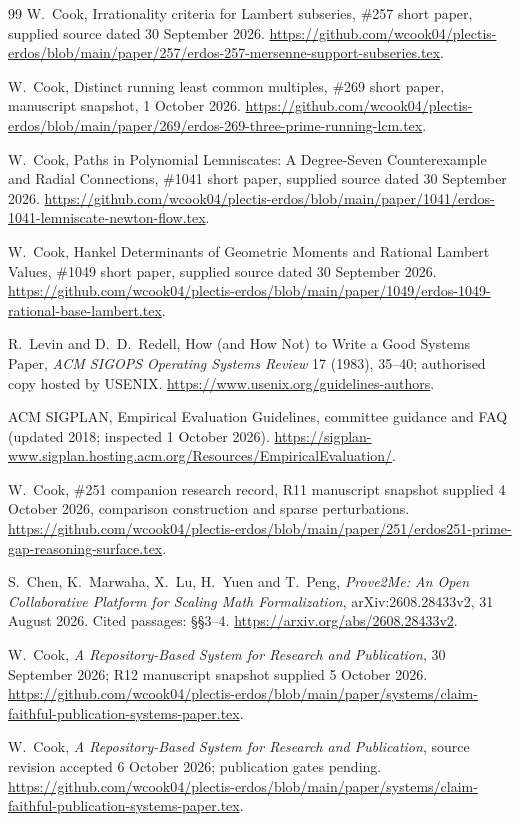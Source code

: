 \begin{thebibliography}{99}
W.~Cook, Irrationality criteria for Lambert subseries,
\#257 short paper, supplied source dated 30 September 2026.
\url{https://github.com/wcook04/plectis-erdos/blob/main/paper/257/erdos-257-mersenne-support-subseries.tex}.

W.~Cook, Distinct running least common multiples,
\#269 short paper, manuscript snapshot, 1 October 2026.
\url{https://github.com/wcook04/plectis-erdos/blob/main/paper/269/erdos-269-three-prime-running-lcm.tex}.

W.~Cook, Paths in Polynomial Lemniscates: A Degree-Seven Counterexample and Radial Connections,
\#1041 short paper, supplied source dated 30 September 2026.
\url{https://github.com/wcook04/plectis-erdos/blob/main/paper/1041/erdos-1041-lemniscate-newton-flow.tex}.

W.~Cook, Hankel Determinants of Geometric Moments and Rational Lambert Values,
\#1049 short paper, supplied source dated 30 September 2026.
\url{https://github.com/wcook04/plectis-erdos/blob/main/paper/1049/erdos-1049-rational-base-lambert.tex}.

R.~Levin and D.~D.~Redell, How (and How Not) to Write a Good Systems Paper,
\emph{ACM SIGOPS Operating Systems Review} 17 (1983), 35--40;
authorised copy hosted by USENIX.
\url{https://www.usenix.org/guidelines-authors}.

ACM SIGPLAN, Empirical Evaluation Guidelines, committee guidance and FAQ
(updated 2018; inspected 1 October 2026).
\url{https://sigplan-www.sigplan.hosting.acm.org/Resources/EmpiricalEvaluation/}.

W.~Cook, \#251 companion research record, R11 manuscript snapshot
supplied 4 October 2026, comparison construction and sparse perturbations.
\url{https://github.com/wcook04/plectis-erdos/blob/main/paper/251/erdos251-prime-gap-reasoning-surface.tex}.

S.~Chen, K.~Marwaha, X.~Lu, H.~Yuen and T.~Peng,
\emph{Prove2Me: An Open Collaborative Platform for Scaling Math Formalization},
arXiv:2608.28433v2, 31 August 2026. Cited passages: \S\S3--4.
\url{https://arxiv.org/abs/2608.28433v2}.

W.~Cook, \emph{A Repository-Based System for Research and Publication},
30 September 2026; R12 manuscript snapshot supplied 5 October 2026.
\url{https://github.com/wcook04/plectis-erdos/blob/main/paper/systems/claim-faithful-publication-systems-paper.tex}.

W.~Cook, \emph{A Repository-Based System for Research and Publication},
source revision accepted 6 October 2026; publication gates pending.
\url{https://github.com/wcook04/plectis-erdos/blob/main/paper/systems/claim-faithful-publication-systems-paper.tex}.

\end{thebibliography}

